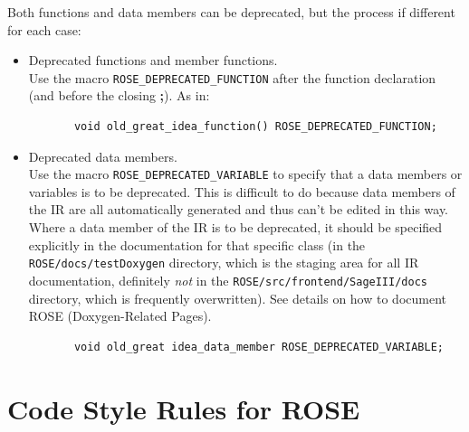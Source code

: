 Both functions and data members can be deprecated, but the process if different 
for each case:
\begin{itemize}
    \item Deprecated functions and member functions. \\
          Use the macro {\tt ROSE\_DEPRECATED\_FUNCTION} after the function declaration (and before
          the closing {\bf ;}). As in:
{\indent
{\mySmallFontSize
\begin{verbatim}
       void old_great_idea_function() ROSE_DEPRECATED_FUNCTION;
\end{verbatim}
}}

    \item Deprecated data members. \\
        Use the macro {\tt ROSE\_DEPRECATED\_VARIABLE} to specify that a data members 
    or variables is to be deprecated.  This is difficult to do because data members of 
    the IR are all automatically generated and thus can't be edited in this way.  Where 
    a data member of the IR is to be deprecated, it should be specified explicitly in
    the documentation for that specific class (in the {\tt ROSE/docs/testDoxygen} directory,
    which is the staging area for all IR documentation, definitely {\em not} in the 
    {\tt ROSE/src/frontend/SageIII/docs} directory, which is frequently overwritten).  See
    details on how to document ROSE (Doxygen-Related Pages).
{\indent
{\mySmallFontSize
\begin{verbatim}
       void old_great idea_data_member ROSE_DEPRECATED_VARIABLE;
\end{verbatim} 
}}
\end{itemize}


\section{Code Style Rules for ROSE}%

